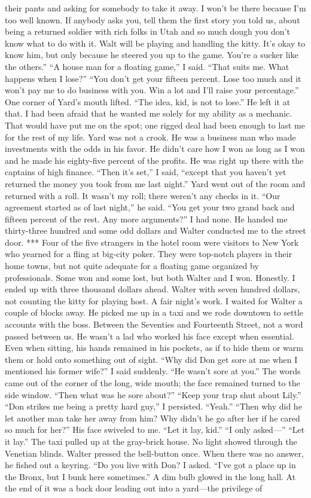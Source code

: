 \documentclass{novel}
\begin{document}
their pants and asking for somebody to take it away. I won’t be there because I’m too well known. If anybody asks you, tell them the first story you told us, about being a returned soldier with rich folks in Utah and so much dough you don’t know what to do with it. Walt will be playing and handling the kitty. It’s okay to know him, but only because he steered you up to the game. You’re a sucker like the others.” “A house man for a floating game,” I said. “That suits me. What happens when I lose?” “You don’t get your fifteen percent. Lose too much and it won’t pay me to do business with you. Win a lot and I’ll raise your percentage.” One corner of Yard’s mouth lifted. “The idea, kid, is not to lose.” He left it at that. I had been afraid that he wanted me solely for my ability as a mechanic. That would have put me on the spot; one rigged deal had been enough to last me for the rest of my life. Yard was not a crook. He was a business man who made investments with the odds in his favor. He didn’t care how I won as long as I won and he made his eighty-five percent of the profits. He was right up there with the captains of high finance. “Then it’s set,” I said, “except that you haven’t yet returned the money you took from me last night.” Yard went out of the room and returned with a roll. It wasn’t my roll; there weren’t any checks in it. “Our agreement started as of last night,” he said. “You get your two grand back and fifteen percent of the rest. Any more arguments?” I had none. He handed me thirty-three hundred and some odd dollars and Walter conducted me to the street door. *** Four of the five strangers in the hotel room were visitors to New York who yearned for a fling at big-city poker. They were top-notch players in their home towns, but not quite adequate for a floating game organized by professionals. Some won and some lost, but both Walter and I won. Honestly. I ended up with three thousand dollars ahead. Walter with seven hundred dollars, not counting the kitty for playing host. A fair night’s work. I waited for Walter a couple of blocks away. He picked me up in a taxi and we rode downtown to settle accounts with the boss. Between the Seventies and Fourteenth Street, not a word passed between us. He wasn’t a lad who worked his face except when essential. Even when sitting, his hands remained in his pockets, as if to hide them or warm them or hold onto something out of sight. “Why did Don get sore at me when I mentioned his former wife?” I said suddenly. “He wasn’t sore at you.” The words came out of the corner of the long, wide mouth; the face remained turned to the side window. “Then what was he sore about?” “Keep your trap shut about Lily.” “Don strikes me being a pretty hard guy,” I persisted. “Yeah.” “Then why did he let another man take her away from him? Why didn’t he go after her if he cared so much for her?” His face swiveled to me. “Let it lay, kid.” “I only asked—” “Let it lay.” The taxi pulled up at the gray-brick house. No light showed through the Venetian blinds. Walter pressed the bell-button once. When there was no answer, he fished out a keyring. “Do you live with Don? I asked. “I’ve got a place up in the Bronx, but I bunk here sometimes.” A dim bulb glowed in the long hall. At the end of it was a back door leading out into a yard—the privilege of 
\end{document}
